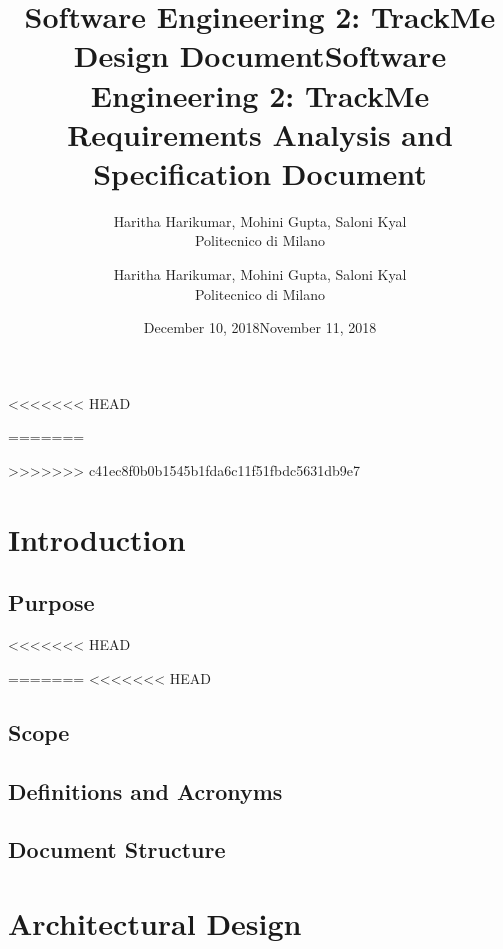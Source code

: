 \documentclass[12pt, a4paper]{report}
\begin{document}
<<<<<<< HEAD
\title{Software Engineering 2: TrackMe \\ \vspace{1em} Design Document}
\author{Haritha Harikumar, Mohini Gupta, Saloni Kyal\\
Politecnico di Milano}
\date{December 10, 2018}
=======
\title{Software Engineering 2: TrackMe \\ \vspace{1em} Requirements Analysis and Specification Document}
\author{Haritha Harikumar, Mohini Gupta, Saloni Kyal\\
Politecnico di Milano}
\date{November 11, 2018}
>>>>>>> c41ec8f0b0b1545b1fda6c11f51fbdc5631db9e7
\maketitle
\tableofcontents

\chapter{Introduction}
\label{ch:introduction}

\section{Purpose}
<<<<<<< HEAD

=======
<<<<<<< HEAD


\section{Scope}


\section{Definitions and Acronyms}


\section{Document Structure}


\chapter{Architectural Design}
\label{ch:architectural_design}
\end{document}
